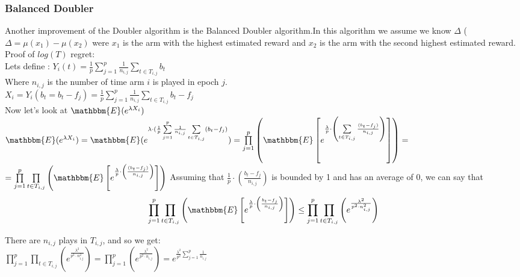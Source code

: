 \documentclass{llncs}
\begin{document}
	\subsubsection{Balanced Doubler}
		Another improvement of the Doubler algorithm is the Balanced Doubler algorithm.In this algorithm we assume we know $\Delta$ ($\Delta = \mu(x_1) - \mu(x_2)$ were $x_1$ is the arm with the highest estimated reward and $x_2$ is the arm with the second highest estimated reward.
		\\
		Proof of $log(T)$ regret:
		\\
		Lets define : $Y_i(t) = \frac{1}{p}\sum\limits_{j=1}^{p}\frac{1}{n_{i,j}}
						   \sum\limits_{t\in T_{i,j}} b_t$		
		\\
		Where $n_{i,j}$ is the number of time arm $i$ is played in epoch $j$.\\
		$X_i = Y_i (b_t = b_t- f_j) =   \frac{1}{p}\sum\limits_{j=1}^{p}\frac{1}{n_{i,j}}
						   \sum\limits_{t\in T_{i,j}} b_t-f_j$	
		\\
		Now let's look at $\mathbbm{E}(e^{\lambda X_i})$
		\\	
		$\mathbbm{E}(e^{\lambda X_i}) = \mathbbm{E}(e^{\lambda\cdot(
		\frac{1}{p}\sum\limits_{j=1}^{p}\frac{1}{n_{i,j}}
						   \sum\limits_{t\in T_{i,j}}( b_t-f_j
						   )}) =						      	   
						   \prod\limits_{j=1}^{p}
						   \left(
						   \mathbbm{E}\left[e^{\frac{\lambda}{p}\cdot\left(
						   	   \sum\limits_{t\in T_{i,j}}
						   	   		\frac{(b_t-f_j)}{n_{i,j}}
						\right)}\right]
						   \right)=
						   $		
						   \\
						   $ =						      	   
						   \prod\limits_{j=1}^{p}
						   \prod\limits_{t\in T_{i,j}}
						   \left(
						   \mathbbm{E}\left[e^{\frac{\lambda}
						   {p}\cdot\left(
						   	   		\frac{(b_t-f_j)}
						   	   		{n_{i,j}}\right)}
						   	   		\right]
						   \right)$
		Assuming that $\frac{1}{p}\cdot\left(\frac{b_t-f_j}
		{n_{i,j}}\right) $ is bounded by 1 and has an average of 0, we can say that
		\\
		$$ \prod\limits_{j=1}^{p}
						   \prod\limits_{t\in T_{i,j}}
						   \left(
						   \mathbbm{E}\left[e^{\frac{\lambda}
						   {p}\cdot\left(
						   	   		\frac{b_t-f_j}
						   	   		{n_{i,j}}\right)}
						   	   		\right]
						   \right) \leq
						   \prod\limits_{j=1}^{p}
						   \prod\limits_{t\in T_{i,j}}
						   \left(
						   e^{\frac{\lambda^2}{p^2\cdot n^2_{i,j}}}
						   \right)
						   $$
						   
						  There are $n_{i,j}$ plays in $T_{i,j}$, and so we get:
						  \\
						  $\prod\limits_{j=1}^{p}
						   \prod\limits_{t\in T_{i,j}}
						   \left(
						   e^{\frac{\lambda^2}{p^2\cdot n^2_{i,j}}}
						   \right) = 
						   \prod\limits_{j=1}^{p}						   
						   \left(
						   e^{\frac{\lambda^2}{p^2\cdot n_{i,j}}}
						   \right) = 
						   e^{
						   \frac{\lambda^2}{p^2}
						   \sum\limits_{j=1}^{p} \frac{1}{n_{i,j}}
						   }$
						
\end{document}
